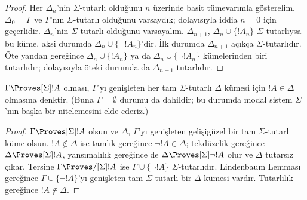 \begin{proof}
Her $\Delta_n$'nin $\Sigma$-tutarlı olduğunu $n$ üzerinde basit
tümevarımla gösterelim. $\Delta_0=\Gamma$ ve $\Gamma$'nın
$\Sigma$-tutarlı olduğunu varsaydık; dolayısıyla iddia $n=0$ için geçerlidir.
$\Delta_n$'nin $\Sigma$-tutarlı olduğunu varsayalım. $\Delta_{n+1}$,
$\Delta_n\cup\{!A_n\}$ $\Sigma$-tutarlıysa bu küme, aksi durumda
$\Delta_n\cup\{\lnot!A_n\}$'dir. İlk durumda $\Delta_{n+1}$ açıkça
$\Sigma$-tutarlıdır. Öte yandan
gereğince $\Delta_n\cup\{!A_n\}$ ya da
$\Delta_n\cup\{\lnot!A_n\}$ kümelerinden biri tutarlıdır; dolayısıyla öteki
durumda da $\Delta_{n+1}$ tutarlıdır.
\end{proof}

\begin{cor}
  $\Gamma\Proves[\Sigma]!A$ olması, $\Gamma$'yı genişleten her tam
  $\Sigma$-tutarlı $\Delta$ kümesi için $!A\in\Delta$ olmasına denktir.
  (Buna $\Gamma=\emptyset$ durumu da dahildir; bu durumda modal sistem
  $\Sigma$'nın başka bir nitelemesini elde ederiz.)
\end{cor}

\begin{proof}
  $\Gamma\Proves[\Sigma]!A$ olsun ve $\Delta$, $\Gamma$'yı genişleten
  gelişigüzel bir tam $\Sigma$-tutarlı küme olsun. $!A\notin\Delta$ ise
  tamlık gereğince $\lnot!A\in\Delta$; tekdüzelik gereğince
  $\Delta\Proves[\Sigma]!A$, yansımalılık gereğince de
  $\Delta\Proves[\Sigma]\lnot!A$ olur ve $\Delta$ tutarsız çıkar. Tersine
  $\Gamma\Proves/[\Sigma]!A$ ise $\Gamma\cup\{\lnot!A\}$
  $\Sigma$-tutarlıdır. Lindenbaum Lemması gereğince
  $\Gamma\cup\{\lnot!A\}$'yı genişleten tam $\Sigma$-tutarlı bir $\Delta$ kümesi
  vardır. Tutarlılık gereğince $!A\notin\Delta$.
\end{proof}

